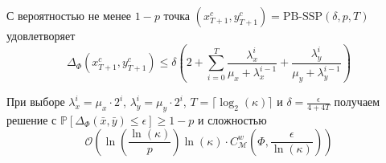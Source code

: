 \begin{theorem}
С вероятностью не менее $1-p$ точка $(x_{T+1}^c, y_{T+1}^c) = \text{PB-SSP}(\delta, p, T)$ удовлетворяет
\begin{equation}
\Delta_{\Phi}(x_{T+1}^c, y_{T+1}^c) \leq \delta\left(2 + \sum_{i=0}^T \frac{\lambda_x^i}{\mu_x + \lambda_x^{i-1}} + \frac{\lambda_y^i}{\mu_y + \lambda_y^{i-1}}\right)
\end{equation}
\end{theorem}

\begin{theorem}
    При выборе $\lambda_x^i = \mu_x \cdot 2^i$, $\lambda_y^i = \mu_y \cdot 2^i$, $T = \lceil \log_2(\kappa) \rceil$ и $\delta = \frac{\epsilon}{4+4T}$ получаем решение с $\mathbb{P}[\Delta_{\Phi}(\bar{x}, \bar{y}) \leq \epsilon] \geq 1-p$ и сложностью
\begin{equation}
\mathcal{O}\left(\ln\left(\frac{\ln(\kappa)}{p}\right) \ln(\kappa) \cdot C_{\mathcal{M}}^w\left(\Phi, \frac{\epsilon}{\ln(\kappa)}\right)\right)
\end{equation}
\end{theorem}




\begin{comment}
\subsection{Сравнение сложностей}

\begin{center}
\begin{tabular}{|l|c|c|c|}
\hline
\textbf{Задача} & \textbf{SAA (ожидание)} & \textbf{SAA (ожидание)} & \textbf{SAA + PB-SSP} \\
 & $\Delta_{\Phi}^w$ & $\Delta_{\Phi}$ & \textbf{(высокая вероятность)} \\
\hline
SC-SC неограниченная & $\mathcal{O}\left(\frac{C\kappa^4}{\mu\epsilon}\right)$ & $\mathcal{O}\left(\frac{C\kappa^4}{\mu\epsilon}\right)$ & $\mathcal{O}\left(\ln^2(\kappa)\ln\left(\frac{\ln(\kappa)}{p}\right) \frac{C\kappa^2}{\mu\epsilon}\right)$ \\
\hline
SC-SC ограниченная & $\mathcal{O}\left(\frac{\ell^2}{\mu\epsilon}\right)$ & $\mathcal{O}\left(\frac{\ell^2\kappa}{\mu\epsilon}\right)$ & $\mathcal{O}\left(\ln^2(\kappa)\ln\left(\frac{\ln(\kappa)}{p}\right) \frac{\ell^2}{\mu\epsilon}\right)$ \\
\hline
C-C ограниченная & $\mathcal{O}\left(\frac{\ell^2 D^2}{\epsilon^2}\right)$ & $\mathcal{O}\left(\frac{\ell^2LD^4}{\epsilon^3}\right)$ & $\mathcal{O}\left(\ln^2\left(\frac{LD^2}{\epsilon}\right)\ln\left(\frac{\ln(LD^2/\epsilon)}{p}\right) \frac{\ell^2D^2}{\epsilon^2}\right)$ \\
\hline
\end{tabular}
\end{center}
\end{comment}


